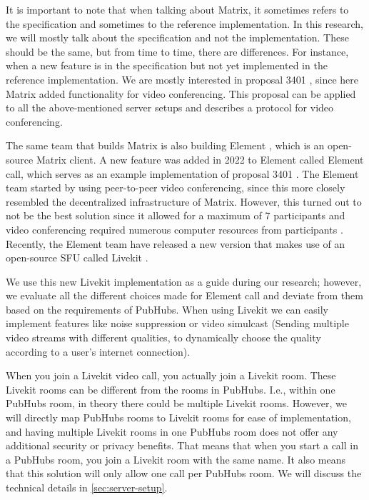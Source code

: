 \documentclass{report}
\begin{document}
It is important to note that when talking about Matrix, it sometimes refers to the specification and sometimes to the
reference implementation. In this research, we will mostly talk about the specification and not the implementation. These
should be the same, but from time to time, there are differences. For instance, when a new feature is in the specification
but not yet implemented in the reference implementation. We are mostly interested in proposal 3401 \cite{
noauthor_matrix-spec-proposalsproposals3401-group-voipmd_nodate}, since here Matrix added functionality for video conferencing. This proposal
can be applied to all the above-mentioned server setups and describes a protocol for video conferencing.

The same team that builds Matrix is also building Element \cite{noauthor_element_nodate}, which is an open-source Matrix client.
A new feature was added in 2022 \cite{noauthor_introducing_2022} to Element called Element call, which serves as an
example implementation of proposal 3401 \cite{noauthor_matrix-spec-proposalsproposals3401-group-voipmd_nodate}.
The Element team started by using peer-to-peer video conferencing, since this more closely resembled the decentralized
infrastructure of Matrix. However, this turned out to not be the best solution since it allowed for a maximum of 7
participants and video conferencing required numerous computer resources from participants \cite{heese_lab3_nodate}.
Recently, the Element team have released a new version that makes use of an open-source SFU called Livekit
\cite{noauthor_livekit_nodate}.

We use this new Livekit implementation as a guide during our research; however, we evaluate all the different
choices made for Element call and deviate from them based on the requirements of PubHubs. When using Livekit we can
easily implement features like noise suppression or video simulcast (Sending multiple video streams with different
qualities, to dynamically choose the quality according to a user's internet connection).

When you join a Livekit video call, you actually join a Livekit room. These Livekit rooms can be different from the
rooms in PubHubs. I.e., within one PubHubs room, in theory there could be multiple Livekit rooms. However, we will
directly map PubHubs rooms to Livekit rooms for ease of implementation, and having multiple Livekit rooms in one
PubHubs room does not offer any additional security or privacy benefits. That means that when you start a
call in a PubHubs room, you join a Livekit room with the same name. It also means that this solution will only allow
one call per PubHubs room. We will discuss the technical details in \autoref{sec:server-setup}.
\end{document}
